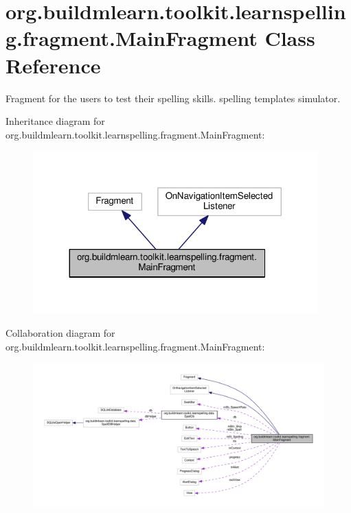 \hypertarget{classorg_1_1buildmlearn_1_1toolkit_1_1learnspelling_1_1fragment_1_1MainFragment}{}\section{org.\+buildmlearn.\+toolkit.\+learnspelling.\+fragment.\+Main\+Fragment Class Reference}
\label{classorg_1_1buildmlearn_1_1toolkit_1_1learnspelling_1_1fragment_1_1MainFragment}


Fragment for the users to test their spelling skills. spelling template\textquotesingle{}s simulator.  




Inheritance diagram for org.\+buildmlearn.\+toolkit.\+learnspelling.\+fragment.\+Main\+Fragment\+:
\nopagebreak
\begin{figure}[H]
\begin{center}
\leavevmode
\includegraphics[width=311pt]{classorg_1_1buildmlearn_1_1toolkit_1_1learnspelling_1_1fragment_1_1MainFragment__inherit__graph}
\end{center}
\end{figure}


Collaboration diagram for org.\+buildmlearn.\+toolkit.\+learnspelling.\+fragment.\+Main\+Fragment\+:
\nopagebreak
\begin{figure}[H]
\begin{center}
\leavevmode
\includegraphics[width=350pt]{classorg_1_1buildmlearn_1_1toolkit_1_1learnspelling_1_1fragment_1_1MainFragment__coll__graph}
\end{center}
\end{figure}
